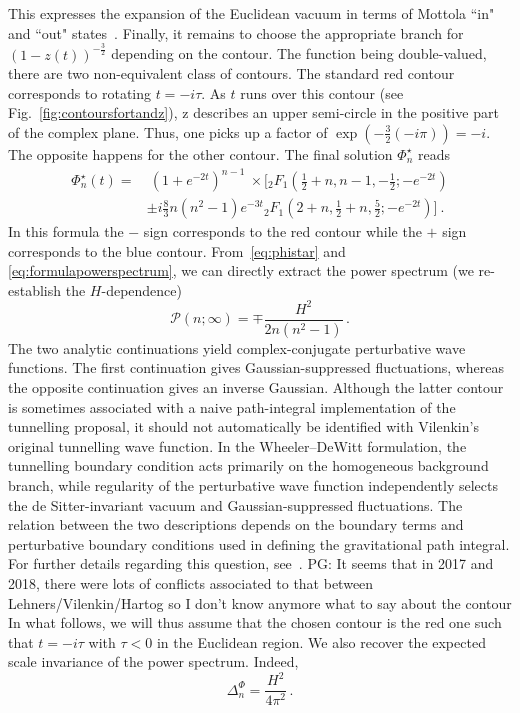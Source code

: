 \documentclass[a4paper,11pt]{article}
\def\t{\tau}
\newcommand{\purple}[1]{{\color{purple} #1 \color{black}}}
\newcommand{\PG}[1]{{\purple{PG: #1}}} %
\def\t{\tau}
\begin{document}
This expresses the expansion of the Euclidean vacuum in terms of Mottola ``in" and ``out" states~\cite{PhysRevD.32.3136,Bousso_2002}. Finally, it remains to choose the appropriate branch for $(1-z(t))^{-\frac{3}{2}}$ depending on the contour. The function being double-valued, there are two non-equivalent class of contours. The standard red contour corresponds to rotating $t=-i\t$. As $t$ runs over this contour (see Fig.~\ref{fig:contoursfortandz}), z describes an upper semi-circle in the positive part of the complex plane. Thus, one picks up a factor of $\exp(-\frac{3}{2}(-i\pi))=-i$. The opposite happens for the other contour. The final solution $\Phi^\star_n$ reads
\begin{equation}
    \begin{aligned}
         \Phi_n^\star(t)= &~ (1+e^{-2t})^{n-1}~\times \Bigg[{}_2F_1\left(\frac{1}{2}+n,n-1,-\frac{1}{2};-e^{-2t}\right)\\
         &\pm i\frac{8}{3}n(n^2-1)e^{-3t}{}_2F_1\left(2+n,\frac{1}{2}+n,\frac{5}{2};-e^{-2t}\right)\Bigg]~.
    \end{aligned}
\end{equation}
In this formula the $-$ sign corresponds to the red contour while the $+$ sign corresponds to the blue contour. From~\eqref{eq:phistar} and \eqref{eq:formulapowerspectrum}, we can directly extract the power spectrum (we re-establish the $H$-dependence)
\begin{equation}\label{eq:power_spectrum_BD}
    \mathcal{P}(n; \infty)=\mp \frac{H^2}{2n(n^2-1)}\,.
\end{equation}
The two analytic continuations yield complex-conjugate perturbative wave functions. The first continuation gives Gaussian-suppressed fluctuations, whereas the opposite continuation gives an inverse Gaussian. Although the latter contour is sometimes associated with a naive path-integral implementation of the tunnelling proposal, it should not automatically be identified with Vilenkin’s original tunnelling wave function. In the Wheeler–DeWitt formulation, the tunnelling boundary condition acts primarily on the homogeneous background branch, while regularity of the perturbative wave function independently selects the de Sitter-invariant vacuum and Gaussian-suppressed fluctuations. The relation between the two descriptions depends on the boundary terms and perturbative boundary conditions used in defining the gravitational path integral. For further details regarding this question, see~\cite{PhysRevD.37.888,Lehners:2023yrj,Vilenkin_2018}.\PG{It seems that in 2017 and 2018, there were lots of conflicts associated to that between Lehners/Vilenkin/Hartog so I don't know anymore what to say about the contour}In what follows, we will thus assume that the chosen contour is the red one such that $t=-i\tau$ with $\tau<0$ in the Euclidean region. We also recover the expected scale invariance of the power spectrum. Indeed,
\begin{equation}\label{eq:dimensionless_power_spectrum_BD}
    \Delta^{\Phi}_{n}=\frac{H^2}{4\pi^2}\,.
\end{equation}
\end{document}

